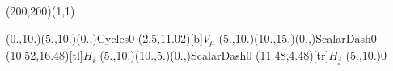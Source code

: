 \documentclass[12pt]{article}
\begin{document}
 
 \thispagestyle{empty}
	
 \begin{feynartspicture}(200,200)(1,1) 
 \FADiagram{} 
 
 \FAProp(0.,10.)(5.,10.)(0.,){Cycles}{0}
\FALabel(2.5,11.02)[b]{$V_{\mu}$}
\FAProp(5.,10.)(10.,15.)(0.,){ScalarDash}{0}
\FALabel(10.52,16.48)[tl]{$H_i$}
\FAProp(5.,10.)(10.,5.)(0.,){ScalarDash}{0}
\FALabel(11.48,4.48)[tr]{$H_j$}
\FAVert(5.,10.){0}	
 
 \end{feynartspicture} 
 
\end{document}

